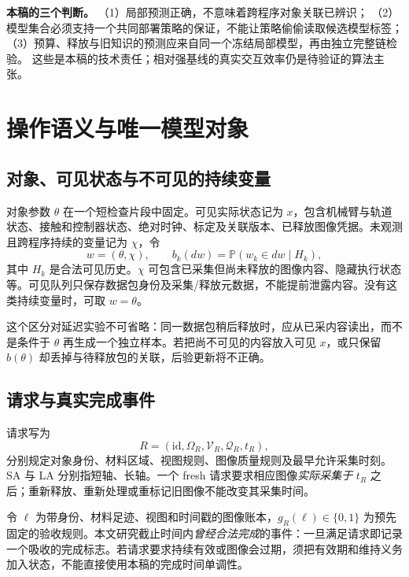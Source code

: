 \documentclass[11pt,a4paper,fontset=fandol]{ctexart}
\theoremstyle{definition}
\theoremstyle{remark}
\numberwithin{equation}{section}
\newcommand{\Pp}{\mathbb P}
\begin{document}
\begin{corebox}
\textbf{本稿的三个判断。}
（1）局部预测正确，不意味着跨程序对象关联已辨识；
（2）模型集合必须支持一个共同部署策略的保证，不能让策略偷偷读取候选模型标签；
（3）预算、释放与旧知识的预测应来自同一个冻结局部模型，再由独立完整链检验。
这些是本稿的技术责任；相对强基线的真实交互效率仍是待验证的算法主张。
\end{corebox}
\section{操作语义与唯一模型对象}
\label{sec:model}
\subsection{对象、可见状态与不可见的持续变量}
对象参数 $\theta$ 在一个短检查片段中固定。可见实际状态记为 $x$，包含机械臂与轨道状态、接触和控制器状态、绝对时钟、标定及关联版本、已释放图像凭据。未观测且跨程序持续的变量记为 $\chi$，令
\begin{equation}
 w=(\theta,\chi),\qquad b_k(dw)=\Pp(w_k\in dw\mid H_k),
 \label{eq:hidden}
\end{equation}
其中 $H_k$ 是合法可见历史。$\chi$ 可包含已采集但尚未释放的图像内容、隐藏执行状态等。可见队列只保存数据包身份及采集/释放元数据，不能提前泄露内容。没有这类持续变量时，可取 $w=\theta$。

这个区分对延迟实验不可省略：同一数据包稍后释放时，应从已采内容读出，而不是条件于 $\theta$ 再生成一个独立样本。若把尚不可见的内容放入可见 $x$，或只保留 $b(\theta)$ 却丢掉与待释放包的关联，后验更新将不正确。

\subsection{请求与真实完成事件}
请求写为
\begin{equation}
 R=(\mathrm{id},\Omega_R,\mathcal V_R,\mathcal Q_R,t_R),
 \label{eq:request}
\end{equation}
分别规定对象身份、材料区域、视图规则、图像质量规则及最早允许采集时刻。SA 与 LA 分别指短轴、长轴。一个 fresh 请求要求相应图像\emph{实际采集于} $t_R$ 之后；重新释放、重新处理或重标记旧图像不能改变其采集时间。

令 $\ell$ 为带身份、材料足迹、视图和时间戳的图像账本，$g_R(\ell)\in\{0,1\}$ 为预先固定的验收规则。本文研究截止时间内\emph{曾经合法完成}的事件：一旦满足请求即记录一个吸收的完成标志。若请求要求持续有效或图像会过期，须把有效期和维持义务加入状态，不能直接使用本稿的完成时间单调性。
\end{document}
